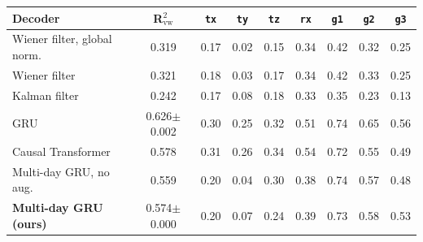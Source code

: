 \begin{tabular}{l c ccccccc}
\toprule
Decoder & R$^2_{\mathrm{vw}}$ & \texttt{tx} & \texttt{ty} & \texttt{tz} & \texttt{rx} & \texttt{g1} & \texttt{g2} & \texttt{g3} \\
\midrule
Wiener filter, global norm. & 0.319 & 0.17 & 0.02 & 0.15 & 0.34 & 0.42 & 0.32 & 0.25 \\
Wiener filter & 0.321 & 0.18 & 0.03 & 0.17 & 0.34 & 0.42 & 0.33 & 0.25 \\
Kalman filter & 0.242 & 0.17 & 0.08 & 0.18 & 0.33 & 0.35 & 0.23 & 0.13 \\
GRU & 0.626{\scriptsize$\pm$0.002} & 0.30 & 0.25 & 0.32 & 0.51 & 0.74 & 0.65 & 0.56 \\
Causal Transformer & 0.578 & 0.31 & 0.26 & 0.34 & 0.54 & 0.72 & 0.55 & 0.49 \\
Multi-day GRU, no aug. & 0.559 & 0.20 & 0.04 & 0.30 & 0.38 & 0.74 & 0.57 & 0.48 \\
\textbf{Multi-day GRU (ours)} & 0.574{\scriptsize$\pm$0.000} & 0.20 & 0.07 & 0.24 & 0.39 & 0.73 & 0.58 & 0.53 \\
\bottomrule
\end{tabular}
